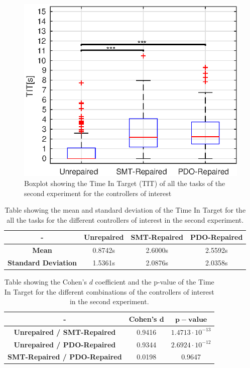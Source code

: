 \begin{figure}[H]
    \centering
    \includegraphics[width=\textwidth]{Images/second-experiment/exp1_TIT.eps}
    \caption{Boxplot showing the Time In Target (TIT) of all the tasks of the second experiment for the controllers of interest}
    \label{fig:box-TIT-all-second}
\end{figure}
\begin{table}[H]
    \centering
    \begin{tabular}{|c|c|c|c|}
        \hline
        - & \textbf{Unrepaired} & \textbf{SMT-Repaired} & \textbf{PDO-Repaired} \\
        \hline
        \textbf{Mean} & 0.8742s & 2.6000s & 2.5592s \\
        \textbf{Standard Deviation} & 1.5361s & 2.0876s & 2.0358s \\
        \hline
    \end{tabular}
    \caption{Table showing the mean and standard deviation of the Time In Target for the all the tasks for the different controllers of interest in the second experiment.}
    \label{tab:TIT-all-second-mean-std}
\end{table}
\begin{table}[H]
    \centering
    \begin{tabular}{|c|c|c|}
        \hline
        - & \textbf{Cohen's} $\mathbf{d}$ & $\mathbf{p-value}$ \\
        \hline
        \textbf{Unrepaired / SMT-Repaired} & 0.9416 & $1.4713 \cdot 10^{-13}$ \\
        \textbf{Unrepaired / PDO-Repaired} & 0.9344 & $2.6924 \cdot 10^{-12}$ \\
        \textbf{SMT-Repaired / PDO-Repaired} & 0.0198 & 0.9647 \\
        \hline
    \end{tabular}
    \caption{Table showing the Cohen's $d$ coefficient and the p-value of the Time In Target for the different combinations of the controllers of interest in the second experiment.}
    \label{tab:TIT-all-second-cohen-p}
\end{table}
